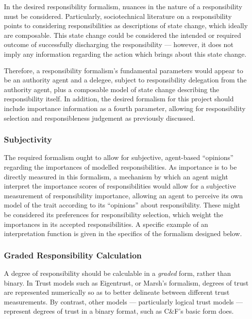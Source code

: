 In the desired responsibility formalism, nuances in the nature of a responsibility must be considered. Particularly, sociotechnical literature on a responsibility points to considering responsibilities as descriptions of state change, which ideally are composable. This state change could be considered the intended or required outcome of successfully discharging the responsibility --- however, it does not imply any information regarding the action which brings about this state change.\par

Therefore, a responsibility formalism's fundamental parameters would appear to be an authority agent and a delegee, subject to responsibility delegation from the authority agent, plus a composable model of state change describing the responsibility itself. In addition, the desired formalism for this project should include importance information as a fourth parameter, allowing for responsibility selection and responsibleness judgement as previously discussed.\par

\subsubsection{Subjectivity}
The required formalism ought to allow for subjective, agent-based ``opinions'' regarding the importances of modelled responsibilities. As importance is to be directly measured in this formalism, a mechanism by which an agent might interpret the importance scores of responsibilities would allow for a subjective measurement of responsibility importance, allowing an agent to perceive its own model of the trait according to its ``opinions'' about responsibility. These might be considered its preferences for responsibility selection, which weight the importances in its accepted responsibilities. A specific example of an interpretation function is given in the specifics of the formalism designed below.

\subsubsection{Graded Responsibility Calculation}
A degree of responsibility should be calculable in a \emph{graded} form, rather than binary. In Trust models such as Eigentrust, or Marsh's formalism, degrees of trust are represented numerically so as to better delineate between different trust measurements. By contrast, other models --- particularly logical trust models --- represent degrees of trust in a binary format, such as C\&F's basic form does.\par

